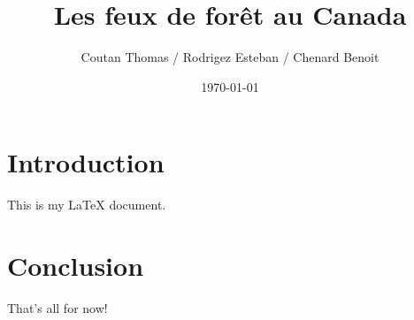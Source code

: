 \documentclass{article}
\begin{document}
\title{Les feux de forêt au Canada}
\author{Coutan Thomas / Rodrigez Esteban / Chenard Benoit}
\date{\today}
\maketitle

\section{Introduction}

This is my LaTeX document.

\section{Conclusion}

That's all for now!
\end{document}
